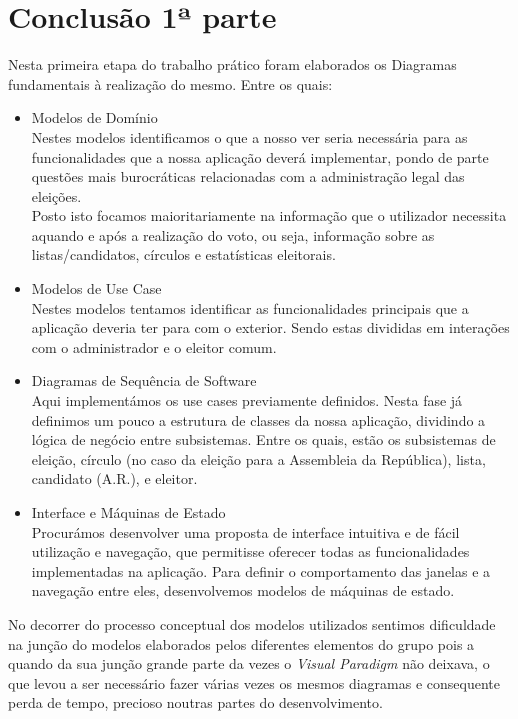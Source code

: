 \documentclass[a4paper,12pt]{report}
\begin{document}
\section{Conclusão 1ª parte}
Nesta primeira etapa do trabalho prático foram elaborados os Diagramas fundamentais à realização do mesmo. Entre os quais:
\begin{itemize}
\item Modelos de Domínio
\\Nestes modelos identificamos o que a nosso ver seria necessária para as funcionalidades que a nossa aplicação deverá implementar, pondo de parte questões mais burocráticas relacionadas com a administração legal das eleições. 
\\\indent Posto isto focamos maioritariamente na informação que o utilizador necessita aquando e após a realização do voto, ou seja, informação sobre as listas/candidatos, círculos e estatísticas eleitorais.

\item Modelos de Use Case
\\Nestes modelos tentamos identificar as funcionalidades principais que a aplicação deveria ter para com o exterior. Sendo estas divididas em interações com o administrador e o eleitor comum.

\item Diagramas de Sequência de Software
\\Aqui implementámos os use cases previamente definidos. Nesta fase já definimos um pouco a estrutura de classes da nossa aplicação, dividindo a lógica de negócio entre subsistemas. Entre os quais, estão os subsistemas de eleição, círculo (no caso da eleição para a Assembleia da República), lista, candidato (A.R.), e eleitor.

\item Interface e Máquinas de Estado
\\Procurámos desenvolver uma proposta de interface intuitiva e de fácil utilização e navegação, que permitisse oferecer todas as funcionalidades implementadas na aplicação. Para definir o comportamento das janelas e a navegação entre eles, desenvolvemos modelos de máquinas de estado.
\end{itemize}
\indent No decorrer do processo conceptual dos modelos utilizados sentimos dificuldade na junção do modelos elaborados pelos diferentes elementos do grupo pois a quando da sua junção grande parte da vezes o \emph{Visual Paradigm} não deixava, o que levou a ser necessário fazer várias vezes os mesmos diagramas e consequente perda de tempo, precioso noutras partes do desenvolvimento.
\newpage
\end{document}
